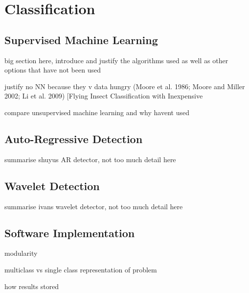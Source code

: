 \section{Classification}
\label{sec:pl-clf}

    \subsection{Supervised Machine Learning}
    \label{subsec:pl-clf-sup}
        \begin{sitemize}
            \item{big section here, introduce and justify the algorithms used as well as other options that have not been used}
            \item{justify no NN because they v data hungry  (Moore et al. 1986; Moore and Miller 2002; Li et al. 2009) [Flying Insect Classification with Inexpensive}
            \item{compare unsupervised machine learning and why havent used}
        \end{sitemize}
    
    \subsection{Auto-Regressive Detection}
    \label{subsec:pl-clf-ar}
        \begin{sitemize}
            \item{summarise shuyus AR detector, not too much detail here}
        \end{sitemize}
    
    \subsection{Wavelet Detection}
    \label{subsec:pl-clf-wavelet}
        \begin{sitemize}
            \item{summarise ivans wavelet detector, not too much detail here}
        \end{sitemize}

    \subsection{Software Implementation}
    \label{subsec:pl-clf-software}
        \begin{sitemize}
            \item{modularity}
            \item{multiclass vs single class representation of problem}
            \item{how results stored}
        \end{sitemize}